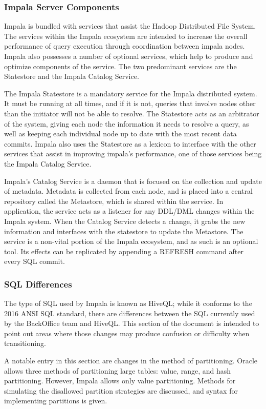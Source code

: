 \documentclass[onecolumn, draftclsnofoot,10pt, compsoc]{IEEEtran}
\begin{document}
\subsubsection{Impala Server Components}
Impala is bundled with services that assist the Hadoop Distributed File System.
The services within the Impala ecosystem are intended to increase the overall performance of query execution through coordination between impala nodes.
Impala also possesses a number of optional services, which help to produce and optimize components of the service.
The two predominant services are the Statestore and the Impala Catalog Service. 

The Impala Statestore is a mandatory service for the Impala distributed system.
It must be running at all times, and if it is not, queries that involve nodes other than the initiator will not be able to resolve.
The Statestore acts as an arbitrator of the system, giving each node the information it needs to resolve a query, as well as keeping each individual node up to date with the most recent data commits.
Impala also uses the Statestore as a lexicon to interface with the other services that assist in improving impala’s performance, one of those services being the Impala Catalog Service. 

Impala’s Catalog Service is a daemon that is focused on the collection and update of metadata.
Metadata is collected from each node, and is placed into a central repository called the Metastore, which is shared within the service.
In application, the service acts as a listener for any DDL/DML changes within the Impala system.
When the Catalog Service detects a change, it grabs the new information and interfaces with the statestore to update the Metastore.
The service is a non-vital portion of the Impala ecosystem, and as such is an optional tool.
Its effects can be replicated by appending a REFRESH command after every SQL commit.

\subsubsection{SQL Differences}
The type of SQL used by Impala is known as HiveQL; while it conforms to the 2016 ANSI SQL standard, there are differences between the SQL currently used by the BackOffice team and HiveQL.
This section of the document is intended to point out areas where those changes may produce confusion or difficulty when transitioning.

A notable entry in this section are changes in the method of partitioning.
Oracle allows three methods of partitioning large tables: value, range, and hash partitioning.
However, Impala allows only value partitioning.
Methods for simulating the disallowed partition strategies are discussed, and syntax for implementing partitions is given. 
\end{document}
